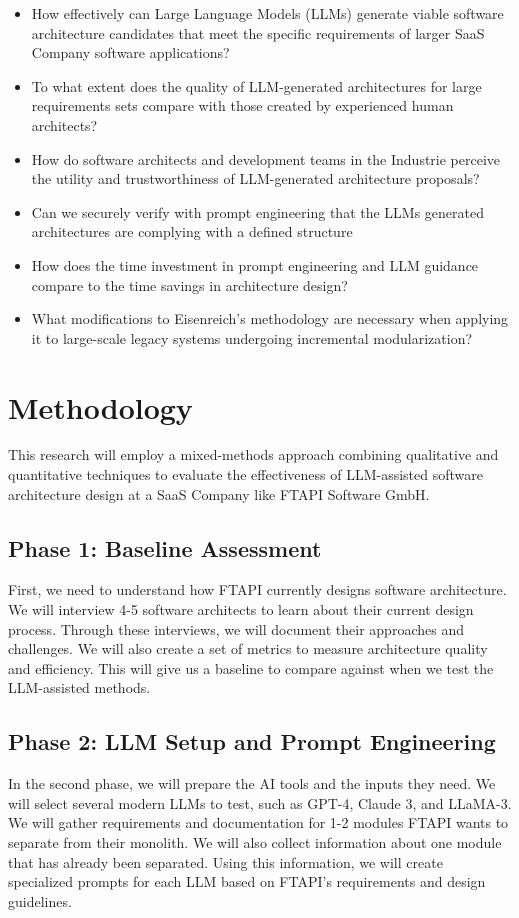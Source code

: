 \documentclass[12pt,a4paper]{article}
\begin{document}
\begin{itemize}
    \item How effectively can Large Language Models (LLMs) generate viable software architecture candidates that meet the specific requirements of larger SaaS Company software applications?
    \item To what extent does the quality of LLM-generated architectures for large requirements sets compare with those created by experienced human architects?
    \item How do software architects and development teams in the Industrie perceive the utility and trustworthiness of LLM-generated architecture proposals?
    \item Can we securely verify with prompt engineering that the LLMs generated architectures are complying with a defined structure
    \item How does the time investment in prompt engineering and LLM guidance compare to the time savings in architecture design?
    \item What modifications to Eisenreich's methodology are necessary when applying it to large-scale legacy systems undergoing incremental modularization?
\end{itemize}



\section{Methodology}
This research will employ a mixed-methods approach combining qualitative and quantitative techniques to evaluate the effectiveness of LLM-assisted software architecture design at a SaaS Company like FTAPI Software GmbH.

\subsection{Phase 1: Baseline Assessment}
First, we need to understand how FTAPI currently designs software architecture. We will interview 4-5 software architects to learn about their current design process. Through these interviews, we will document their approaches and challenges. We will also create a set of metrics to measure architecture quality and efficiency. This will give us a baseline to compare against when we test the LLM-assisted methods.

\subsection{Phase 2: LLM Setup and Prompt Engineering}
In the second phase, we will prepare the AI tools and the inputs they need. We will select several modern LLMs to test, such as GPT-4, Claude 3, and LLaMA-3. We will gather requirements and documentation for 1-2 modules FTAPI wants to separate from their monolith. We will also collect information about one module that has already been separated. Using this information, we will create specialized prompts for each LLM based on FTAPI's requirements and design guidelines.
\end{document}
